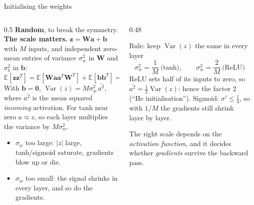 \documentclass[10pt,aspectratio=169]{beamer}
\begin{document}
\begin{frame}{Initialising the weights}
\begin{columns}[T]
\begin{column}{0.5\textwidth}
\small
\textbf{Random}, to break the symmetry.  \textbf{The scale matters.}
$\bm{z}=\bm{W}\bm{a}+\bm{b}$ with $M$ inputs, and independent zero-mean
entries of variance $\sigma_w^{2}$ in $\bm{W}$ and $\sigma_b^{2}$ in
$\bm{b}$:
\[
  \mathbb{E}[\bm{z}\bm{z}^{T}]
  =\mathbb{E}[\bm{W}\bm{a}\bm{a}^{T}\bm{W}^{T}]+\mathbb{E}[\bm{b}\bm{b}^{T}]
  =\bigl(M\sigma_w^{2}\,\overline{a^{2}}+\sigma_b^{2}\bigr)\bm{I}
\]
With $\bm{b}=\bm{0}$, $\operatorname{Var}(z)=M\sigma_w^{2}\,\overline{a^{2}}$, where $\overline{a^{2}}$ is the mean squared \emph{incoming} activation.
For tanh near zero $a\approx z$, so each layer multiplies the variance by $M\sigma_w^{2}$.
\begin{itemize}
  \item $\sigma_w$ too large: $|z|$ large, tanh/sigmoid saturate,
        gradients blow up or die.
  \item $\sigma_w$ too small: the signal shrinks in every layer, and so do
        the gradients.
\end{itemize}
\end{column}
\begin{column}{0.48\textwidth}
\begin{block}{Rule: keep $\operatorname{Var}(z)$ the same in every layer}
\[
  \sigma_w^{2}=\frac{1}{M}\ \text{(tanh)},\qquad
  \sigma_w^{2}=\frac{2}{M}\ \text{(ReLU)}
\]
ReLU sets half of its inputs to zero, so
$\overline{a^{2}}=\frac12\operatorname{Var}(z)$: hence the factor 2 (``He
initialisation'').  Sigmoid: $\sigma'\le\frac14$, so with $1/M$ the
gradients still shrink layer by layer.
\end{block}
\small The right scale depends on the \emph{activation function}, and
it decides whether \emph{gradients} survive the backward pass.
\end{column}
\end{columns}
\end{frame}
\end{document}
